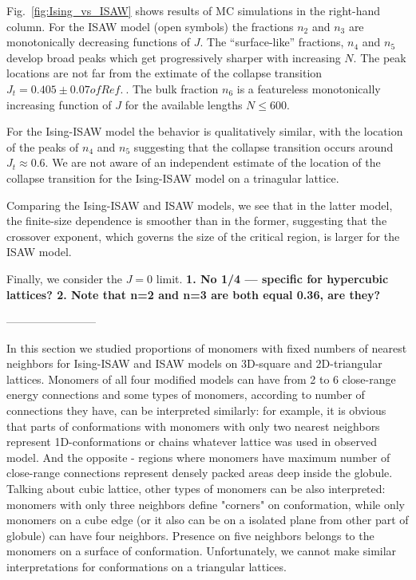 \documentclass[a4paper]{jpconf}
\begin{document}
Fig.\ \ref{fig:Ising_vs_ISAW} shows results of MC simulations in the right-hand
column. For the ISAW model (open symbols) the fractions $n_2$ and $n_3$ are
monotonically decreasing functions of $J$. The ``surface-like'' fractions, $n_4$ and $n_5$
develop broad peaks which get progressively sharper with increasing $N$. The peak
locations are not far from the extimate of the collapse transition
$J_{t} = 0.405 \pm 0.07 of Ref.\ $\cite{Privman1986}. The bulk fraction $n_6$
is a featureless monotonically increasing function of $J$ for the available lengths
$N \leqslant 600$. 

For the Ising-ISAW model the behavior is qualitatively similar, with the location
of the peaks of $n_4$ and $n_5$ suggesting that the collapse transition occurs
around $J_t \approx 0.6$. We are not aware of an independent estimate of the
location of the collapse transition for the Ising-ISAW model on a trinagular lattice.

Comparing the Ising-ISAW and ISAW models, we see that in the latter model,
the finite-size dependence is smoother than in the former, suggesting that the
crossover exponent, which governs the size of the critical region, 
is larger for the ISAW model.


Finally, we consider the $J=0$ limit.
\textbf{1. No 1/4 --- specific for hypercubic lattices?
2. Note that n=2 and n=3 are both equal 0.36, are they?
}

------------------------





In this section we studied proportions of monomers with fixed numbers of nearest neighbors for Ising-ISAW and ISAW models on 3D-square and 2D-triangular lattices. Monomers of all four modified models can have from 2 to 6 close-range energy connections and some types of monomers, according to number of connections they have, can be interpreted similarly: for example, it is obvious that parts of conformations with monomers with only two nearest neighbors represent 1D-conformations or chains whatever lattice was used in observed model. And the opposite - regions where monomers have maximum number of close-range connections represent densely packed areas deep inside the globule. Talking about cubic lattice, other types of monomers can be also interpreted: monomers with only three neighbors define "corners" on conformation, while only monomers on a cube edge (or it also can be on a isolated plane from other part of globule) can have four neighbors. Presence on five neighbors belongs to the monomers on a surface of conformation. Unfortunately, we cannot make similar interpretations for conformations on a triangular lattices.
\end{document}
